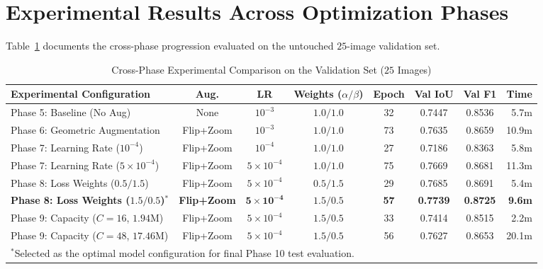 \documentclass[10pt,a4paper]{report}
\begin{document}
\section{Experimental Results Across Optimization Phases}
Table~\ref{tab:cross_phase_comparison} documents the cross-phase progression evaluated on the untouched $25$-image validation set.

\begin{table}[htbp]
\centering
\small
\caption{Cross-Phase Experimental Comparison on the Validation Set ($25$ Images)}
\label{tab:cross_phase_comparison}
\begin{tabular}{lccccccr}
\toprule
\textbf{Experimental Configuration} & \textbf{Aug.} & \textbf{LR} & \textbf{Weights ($\alpha / \beta$)} & \textbf{Epoch} & \textbf{Val IoU} & \textbf{Val F1} & \textbf{Time} \\
\midrule
Phase 5: Baseline (No Aug) & None & $10^{-3}$ & $1.0 / 1.0$ & 32 & 0.7447 & 0.8536 & 5.7m \\
Phase 6: Geometric Augmentation & Flip+Zoom & $10^{-3}$ & $1.0 / 1.0$ & 73 & 0.7635 & 0.8659 & 10.9m \\
Phase 7: Learning Rate ($10^{-4}$) & Flip+Zoom & $10^{-4}$ & $1.0 / 1.0$ & 27 & 0.7186 & 0.8363 & 5.8m \\
Phase 7: Learning Rate ($5\times 10^{-4}$) & Flip+Zoom & $5\times 10^{-4}$ & $1.0 / 1.0$ & 75 & 0.7669 & 0.8681 & 11.3m \\
Phase 8: Loss Weights ($0.5 / 1.5$) & Flip+Zoom & $5\times 10^{-4}$ & $0.5 / 1.5$ & 29 & 0.7685 & 0.8691 & 5.4m \\
\textbf{Phase 8: Loss Weights ($1.5 / 0.5$)$^*$} & \textbf{Flip+Zoom} & $\mathbf{5\times 10^{-4}}$ & $\mathbf{1.5 / 0.5}$ & \textbf{57} & \textbf{0.7739} & \textbf{0.8725} & \textbf{9.6m} \\
Phase 9: Capacity ($C=16$, $1.94$M) & Flip+Zoom & $5\times 10^{-4}$ & $1.5 / 0.5$ & 33 & 0.7414 & 0.8515 & 2.2m \\
Phase 9: Capacity ($C=48$, $17.46$M) & Flip+Zoom & $5\times 10^{-4}$ & $1.5 / 0.5$ & 56 & 0.7627 & 0.8653 & 20.1m \\
\bottomrule
\multicolumn{8}{l}{\footnotesize $^*$Selected as the optimal model configuration for final Phase 10 test evaluation.}
\end{tabular}
\end{table}
\end{document}

